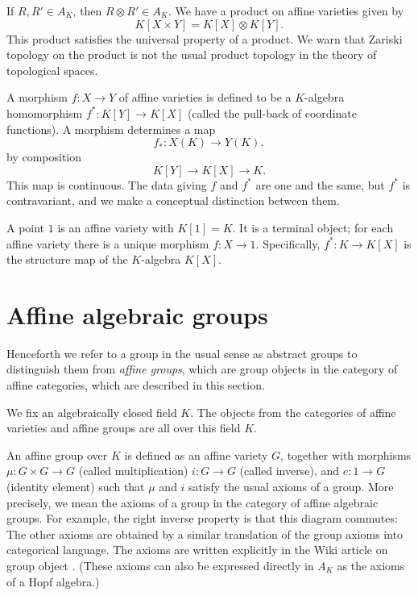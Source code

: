 If $R,R'\in A_K$, then $R\otimes R'\in A_K$.  We have a product on
affine varieties given by
\[
K[X \times Y] = K[X]\otimes K[Y].
\]
This product satisfies the universal property of a product.  We warn
that Zariski topology on the product is not the usual product topology
in the theory of topological spaces.

A morphism $f:X \to Y$ of affine varieties is defined to be a
$K$-algebra homomorphism $f^*:K[Y]\to K[X]$ (called the pull-back of
coordinate functions).  A morphism determines a map
\[
f_*: X(K) \to Y(K),
\]
by composition
\[
K[Y] \to K[X] \to K.
\]
This map is continuous.  The data giving $f$ and $f^*$ are one and the
same, but $f^*$ is contravariant, and we make a conceptual distinction
between them.

A point $1$ is an affine variety with $K[1]=K$.  It is a terminal
object; for each affine variety there is a unique morphism $f:X\to 1$.
Specifically, $f^*:K\to K[X]$ is the structure map of the $K$-algebra
$K[X]$.


\section{Affine algebraic groups}\label{section-affine-algebraic-groups}

Henceforth we refer to a group in the usual sense as abstract groups
to distinguish them from {\it affine groups}, which are group objects
in the category of affine categories, which are described in this
section.

We fix an algebraically closed field $K$.  The objects from the
categories of affine varieties and affine groups are all over this
field $K$.

An affine group over $K$ is defined as an affine variety
$G$, together with morphisms $\mu:G \times G \to G$ (called
multiplication) $i:G \to G$ (called inverse), and $e:1\to G$ (identity
element) such that $\mu$ and $i$ satisfy the usual axioms of a
group. More precisely, we mean the axioms of a group in the category
of affine algebraic groups.  For example, the right inverse property
is that this diagram commutes:
The other axioms are obtained by a similar translation of the group
axioms into categorical language.  The axioms are written explicitly
in the Wiki article on group object \cite{group-object}.  (These
axioms can also be expressed directly in $A_K$ as the axioms of a Hopf
algebra.)

